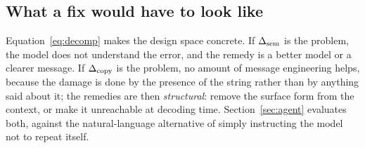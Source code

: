 \subsection{What a fix would have to look like}

Equation~\eqref{eq:decomp} makes the design space concrete. If $\Delta_{\mathrm{sem}}$ is the
problem, the model does not understand the error, and the remedy is a better
model or a clearer message. If $\Delta_{\mathrm{copy}}$ is the problem, no amount of message
engineering helps, because the damage is done by the presence of the string
rather than by anything said about it; the remedies are then \emph{structural}:
remove the surface form from the context, or make it unreachable at decoding
time. Section~\ref{sec:agent} evaluates both, against the natural-language
alternative of simply instructing the model not to repeat itself.
